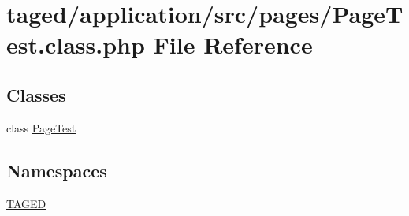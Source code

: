\hypertarget{_page_test_8class_8php}{}\section{taged/application/src/pages/\+Page\+Test.class.\+php File Reference}
\label{_page_test_8class_8php}
\subsection*{Classes}
\begin{DoxyCompactItemize}
\item 
class \hyperlink{class_page_test}{Page\+Test}
\end{DoxyCompactItemize}
\subsection*{Namespaces}
\begin{DoxyCompactItemize}
\item 
 \hyperlink{namespace_t_a_g_e_d}{T\+A\+G\+ED}
\end{DoxyCompactItemize}

